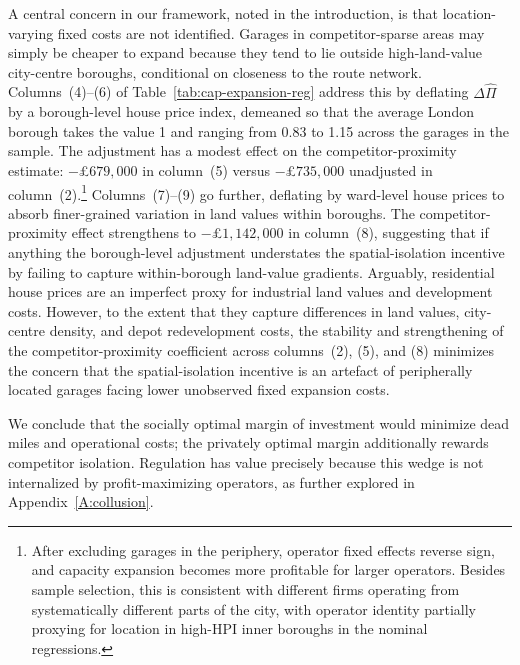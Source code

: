 \documentclass[12pt]{article}
\begin{document}
A central concern in our framework, noted in the introduction, is that
location-varying fixed costs are not identified. Garages in
competitor-sparse areas may simply be cheaper to expand because they tend to
lie outside high-land-value city-centre boroughs, conditional on closeness to
the route network. Columns~(4)--(6) of Table~\ref{tab:cap-expansion-reg}
address this by deflating $\Delta\hat{\Pi}$ by a borough-level house price
index, demeaned so that the average London borough takes the value 1 and
ranging from 0.83 to 1.15 across the garages in the sample. The adjustment
has a modest effect on the competitor-proximity estimate:
$-$\pounds$679{,}000$ in column~(5) versus $-$\pounds$735{,}000$ unadjusted
in column~(2).\footnote{After excluding garages in the periphery, operator
fixed effects reverse sign, and capacity expansion becomes more profitable
for larger operators. Besides sample selection, this is consistent with
different firms operating from systematically different parts of the city,
with operator identity partially proxying for location in high-HPI inner
boroughs in the nominal regressions.} Columns~(7)--(9) go further, deflating
by ward-level house prices to absorb finer-grained variation in land values
within boroughs. The competitor-proximity effect strengthens to
$-$\pounds$1{,}142{,}000$ in column~(8), suggesting that if anything the
borough-level adjustment understates the spatial-isolation incentive by
failing to capture within-borough land-value gradients. Arguably, residential
house prices are an imperfect proxy for industrial land values and
development costs. However, to the extent that they capture differences in
land values, city-centre density, and depot redevelopment costs, the
stability and strengthening of the competitor-proximity coefficient across
columns~(2), (5), and (8) minimizes the concern that the spatial-isolation
incentive is an artefact of peripherally located garages facing lower
unobserved fixed expansion costs.
 
We conclude that the socially optimal margin of investment would minimize
dead miles and operational costs; the privately optimal margin additionally
rewards competitor isolation. Regulation has value precisely because this
wedge is not internalized by profit-maximizing operators, as further explored
in Appendix~\ref{A:collusion}.

\end{document}
